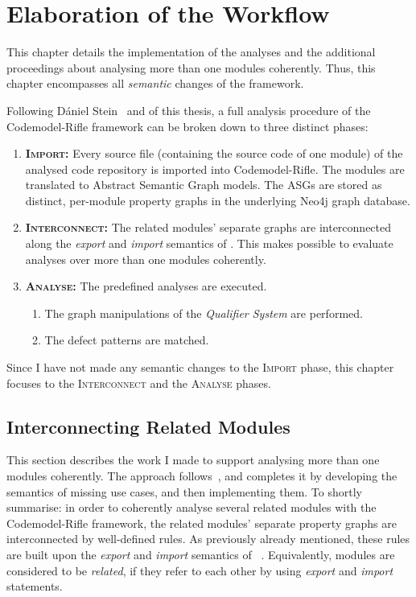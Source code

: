 \chapter{Elaboration of the Workflow}
\label{chapter:elaboration}

This chapter details the implementation of the analyses and the additional proceedings about analysing more than one \es modules coherently. Thus, this chapter encompasses all \emph{semantic} changes of the framework.

Following Dániel Stein~\cite{stein-daniel-msc} and  of this thesis, a full analysis procedure of the Codemodel-Rifle framework can be broken down to three distinct phases:

\begin{enumerate}
\item \textsc{\textbf{Import:}} Every \es source file (containing the source code of one \es module) of the analysed code repository is imported into Codemodel-Rifle. The modules are translated to Abstract Semantic Graph models. The ASGs are stored as distinct, per-module property graphs in the underlying Neo4j graph database.
\item \textsc{\textbf{Interconnect:}} The related modules' separate graphs are interconnected along the \emph{export} and \emph{import} semantics of \es. This makes possible to evaluate analyses over more than one modules coherently.
\item \textsc{\textbf{Analyse:}} The predefined analyses are executed.
	\begin{enumerate}
	\item The graph manipulations of the \emph{Qualifier System} are performed.
	\item The defect patterns are matched.
	\end{enumerate}
\end{enumerate}

Since I have not made any semantic changes to the \textsc{Import} phase, this chapter focuses to the \textsc{Interconnect} and the \textsc{Analyse} phases.


\section{Interconnecting Related \es Modules}
\label{section:interconnect}

This section describes the work I made to support analysing more than one \es modules coherently. The approach follows~\cite{stein-daniel-msc}, and completes it by developing the semantics of missing use cases, and then implementing them. To shortly summarise: in order to coherently analyse several related \es modules with the Codemodel-Rifle framework, the related modules' separate property graphs are interconnected by well-defined rules. As previously already mentioned, these rules are built upon the \emph{export} and \emph{import} semantics of \es~\cite{exploringes6}. Equivalently, \es modules are considered to be \emph{related}, if they refer to each other by using \emph{export} and \emph{import} statements.


